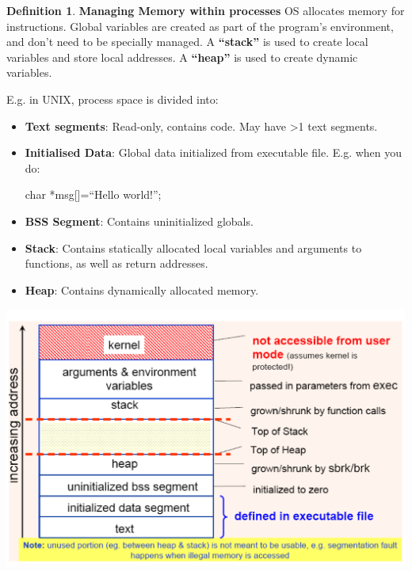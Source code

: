 \documentclass[11pt,a4paper]{article}
\theoremstyle{definition}
\newtheorem{definition}{Definition}[section]
\newenvironment{myitemize}
{ \begin{itemize}
    \setlength{\itemsep}{5pt}
    \setlength{\parskip}{0pt}
    \setlength{\parsep}{0pt}     }
{ \end{itemize}                  }
\begin{document}
\begin{definition}{\textbf{Managing Memory within processes}}
	OS allocates memory for instructions. Global variables are created as part of the program’s environment, and don’t need to be specially managed. A \textbf{``stack''} is used to create local variables and store local addresses. A \textbf{``heap''} is used to create dynamic variables.
	
\begin{minipage}{0.55\linewidth}
	E.g. in UNIX, process space is divided into:
	\begin{myitemize}
		\item \textbf{Text segments}: Read-only, contains code. May have >1 text segments.
		\item \textbf{Initialised Data}: Global data initialized from executable file. E.g. when you do: 

		char *msg[]=``Hello world!'';
		\item \textbf{BSS Segment}: Contains uninitialized globals.
		\item \textbf{Stack}: Contains statically allocated local variables and arguments to functions, as well as return addresses.
		\item \textbf{Heap}: Contains dynamically allocated memory.
	\end{myitemize}
\end{minipage}
\begin{minipage}{0.45\linewidth}
	\includegraphics[width=\linewidth]{m4/processMemory}
\end{minipage}

\end{definition}
\end{document}
